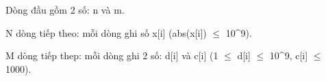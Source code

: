 Dòng đầu gồm 2 số: n và m.

N dòng tiếp theo: mỗi dòng ghi số x[i] (abs(x[i])  $\le$  10^9).

M dòng tiếp thep: mỗi dòng ghi 2 số: d[i] và c[i] (1  $\le$  d[i]  $\le$  10^9, c[i]  $\le$  1000).